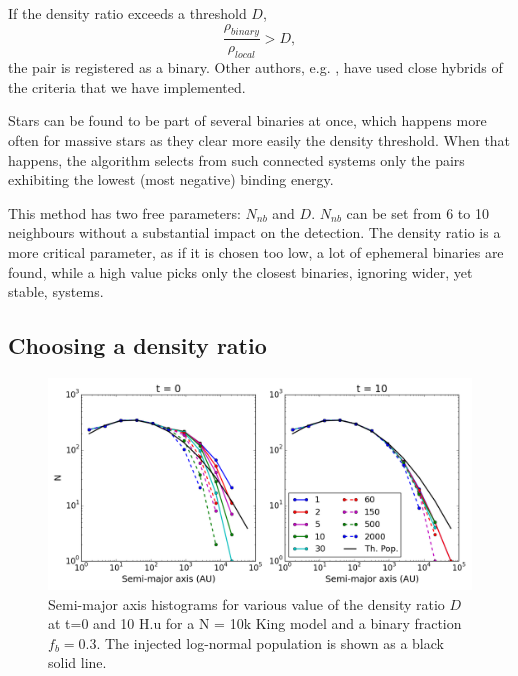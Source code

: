 If the density ratio exceeds a threshold $D$, 
\begin{equation}
\label{Eq:density_ratio}
\frac{ \rho_{binary} }{ \rho_{local} } > D,
\end{equation}
the pair is registered as a binary.  Other authors, e.g. \cite{Parker2009,Lomax2015}, have used close hybrids of the criteria that we have implemented.

Stars can be found to be part of several binaries at once, which happens more often for massive stars as they clear more easily the density threshold. When that happens, the algorithm selects from such connected systems only the pairs exhibiting the lowest (most negative) binding energy.

This method has two free parameters: $N_{nb}$ and $D$. $N_{nb}$ can be set from 6 to 10 neighbours without a substantial impact on the detection. The density ratio is a more critical parameter, as if it is chosen too low, a lot of ephemeral binaries are found, while a high value picks only the closest binaries, ignoring wider, yet stable, systems.



\subsection{Choosing a density ratio}



\begin{figure}
\begin{center}
\includegraphics[width=\textwidth]{Figures/5_sm_ratios}
\caption[Semi-major axis distribution for various value of the density ratio $D$]{Semi-major axis histograms for various value of the density ratio $D$ at t=0 and 10 H.u for a N = 10k King model and a binary fraction $f_b =0.3$. The injected log-normal population is shown as a black solid line.}
\label{Fig:5_sm_ratios}
\end{center}
\end{figure}



